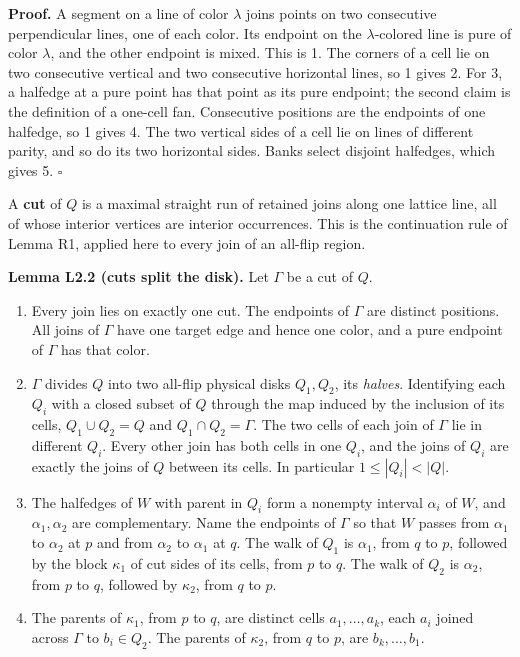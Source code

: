 \documentclass[
  11pt,
]{article}
\newcounter{none} %
\providecommand{\tightlist}{%
  \setlength{\itemsep}{0pt}\setlength{\parskip}{0pt}}
\begin{document}
\textbf{Proof.} A segment on a line of color \(\lambda\) joins points on
two consecutive perpendicular lines, one of each color. Its endpoint on
the \(\lambda\)-colored line is pure of color \(\lambda\), and the other
endpoint is mixed. This is 1. The corners of a cell lie on two
consecutive vertical and two consecutive horizontal lines, so 1 gives 2.
For 3, a halfedge at a pure point has that point as its pure endpoint;
the second claim is the definition of a one-cell fan. Consecutive
positions are the endpoints of one halfedge, so 1 gives 4. The two
vertical sides of a cell lie on lines of different parity, and so do its
two horizontal sides. Banks select disjoint halfedges, which gives 5.
\(\square\)

A \textbf{cut} of \(Q\) is a maximal straight run of retained joins
along one lattice line, all of whose interior vertices are interior
occurrences. This is the continuation rule of Lemma R1, applied here to
every join of an all-flip region.

\textbf{Lemma L2.2 (cuts split the disk).} Let \(\Gamma\) be a cut of
\(Q\).

\begin{enumerate}
\def\labelenumi{\arabic{enumi}.}
\tightlist
\item
  Every join lies on exactly one cut. The endpoints of \(\Gamma\) are
  distinct positions. All joins of \(\Gamma\) have one target edge and
  hence one color, and a pure endpoint of \(\Gamma\) has that color.
\item
  \(\Gamma\) divides \(Q\) into two all-flip physical disks \(Q_1,Q_2\),
  its \emph{halves}. Identifying each \(Q_i\) with a closed subset of
  \(Q\) through the map induced by the inclusion of its cells,
  \(Q_1\cup Q_2=Q\) and \(Q_1\cap Q_2=\Gamma\). The two cells of each
  join of \(\Gamma\) lie in different \(Q_i\). Every other join has both
  cells in one \(Q_i\), and the joins of \(Q_i\) are exactly the joins
  of \(Q\) between its cells. In particular \(1\le|Q_i|<|Q|\).
\item
  The halfedges of \(W\) with parent in \(Q_i\) form a nonempty interval
  \(\alpha_i\) of \(W\), and \(\alpha_1,\alpha_2\) are complementary.
  Name the endpoints of \(\Gamma\) so that \(W\) passes from
  \(\alpha_1\) to \(\alpha_2\) at \(p\) and from \(\alpha_2\) to
  \(\alpha_1\) at \(q\). The walk of \(Q_1\) is \(\alpha_1\), from \(q\)
  to \(p\), followed by the block \(\kappa_1\) of cut sides of its
  cells, from \(p\) to \(q\). The walk of \(Q_2\) is \(\alpha_2\), from
  \(p\) to \(q\), followed by \(\kappa_2\), from \(q\) to \(p\).
\item
  The parents of \(\kappa_1\), from \(p\) to \(q\), are distinct cells
  \(a_1,\ldots,a_k\), each \(a_i\) joined across \(\Gamma\) to
  \(b_i\in Q_2\). The parents of \(\kappa_2\), from \(q\) to \(p\), are
  \(b_k,\ldots,b_1\).
\end{enumerate}
\end{document}
